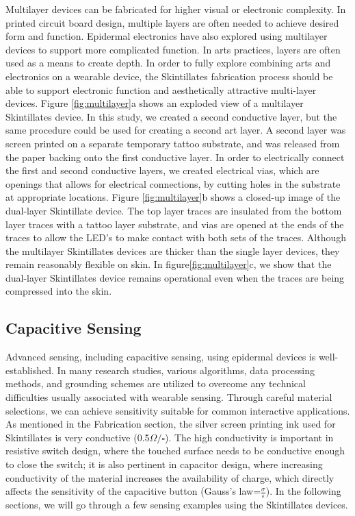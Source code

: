 \documentclass{sigchi}
\begin{document}
Multilayer devices can be fabricated for higher visual or electronic complexity. In printed circuit board design, multiple layers are often needed to achieve desired form and function. Epidermal electronics have also explored using multilayer devices to support more complicated function. In arts practices, layers are often used as a means to create depth. In order to fully explore combining arts and electronics on a wearable device, the Skintillates fabrication process should be able to support electronic function and aesthetically attractive multi-layer devices. Figure \ref{fig:multilayer}a shows an exploded view of a multilayer Skintillates device. In this study, we created a second conductive layer, but the same procedure could be used for creating a second art layer. A second layer was screen printed on a separate temporary tattoo substrate, and was released from the paper backing onto the first conductive layer. In order to electrically connect the first and second conductive layers, we created electrical vias, which are openings that allows for electrical connections, by cutting holes in the substrate at appropriate locations. Figure \ref{fig:multilayer}b shows a closed-up image of the dual-layer Skintillate device. The top layer traces are insulated from the bottom layer traces with a tattoo layer substrate, and vias are opened at the ends of the traces to allow the LED's to make contact with both sets of the traces. Although the multilayer Skintillates devices are thicker than the single layer devices, they remain reasonably flexible on skin. In figure\ref{fig:multilayer}c, we show that the dual-layer Skintillates device remains operational even when the traces are being compressed into the skin. 
\subsection{Capacitive Sensing}
Advanced sensing, including capacitive sensing, using epidermal devices is well-established\cite{Jeong:2013km,Frutiger:2015fm,Mannsfeld:2010is}. In many research studies, various algorithms, data processing methods, and grounding schemes are utilized to overcome any technical difficulties usually associated with wearable sensing.  Through careful material selections, we can achieve sensitivity suitable for common interactive applications. As mentioned in the Fabrication section, the silver screen printing ink used for Skintillates is very conductive (0.5$\Omega/\square$). 
 The high conductivity is important in resistive switch design, where the touched surface needs to be conductive enough to close the switch; it is also pertinent in capacitor design, where increasing conductivity of the material increases the availability of charge, which directly affects the sensitivity of the capacitive button (Gauss’s law=$\frac{\sigma}{\epsilon}$). In the following sections, we will go through a few sensing examples using the Skintillates devices. 
\end{document}
